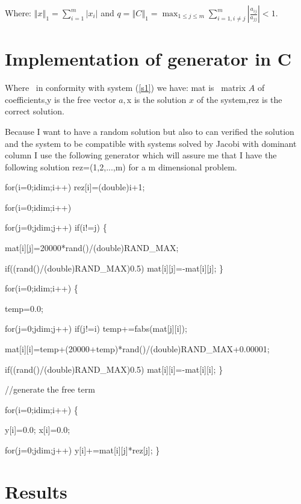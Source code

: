 \documentclass[a4paper]{article}
\begin{document}
Where: $\left\Vert x\right\Vert _{1}=\sum_{i=1}^{m}\left\vert
x_{i}\right\vert $ and $q=\left\Vert C\right\Vert _{1}=\max_{1\leq j\leq
m}\sum_{i=1,i\neq j}^{m}\left\vert \frac{a_{ij}}{a_{jj}}\right\vert <1$.

\section{Implementation of generator in C}

Where \ in conformity with system (\ref{s1}) we have: mat is \ matrix $A$ of
coefficients,y is the free vector $a,$x is the solution $x$ of the
system,rez is the correct solution.

Because I want to have a random solution but also to can verified the
solution and the system to be compatible with systems solved by Jacobi with
dominant column I use the following generator which will assure me that I
have the following solution rez=(1,2,...,m) for a m dimensional problem.

{\small \qquad for(i=0;i\TEXTsymbol{<}dim;i++) rez[i]=(double)i+1;}

{\small \qquad for(i=0;i\TEXTsymbol{<}dim;i++)}

{\small \qquad \qquad for(j=0;j\TEXTsymbol{<}dim;j++) if(i!=j) \{}

{\small \qquad \qquad \qquad \qquad mat[i][j]=20000*rand()/(double)RAND\_MAX;%
}

{\small \qquad \qquad \qquad \qquad if((rand()/(double)RAND\_MAX)\TEXTsymbol{%
<}0.5) mat[i][j]=-mat[i][j]; \}}

{\small \qquad for(i=0;i\TEXTsymbol{<}dim;i++) \{}

{\small \qquad \qquad temp=0.0;}

{\small \qquad \qquad for(j=0;j\TEXTsymbol{<}dim;j++) if(j!=i)
temp+=fabs(mat[j][i]);}

{\small \qquad \qquad
mat[i][i]=temp+(20000+temp)*rand()/(double)RAND\_MAX+0.00001;}

{\small \qquad \qquad if((rand()/(double)RAND\_MAX)\TEXTsymbol{<}0.5)
mat[i][i]=-mat[i][i]; \}}

{\small \qquad //generate the free term}

{\small \qquad for(i=0;i\TEXTsymbol{<}dim;i++) \{}

{\small \qquad \qquad y[i]=0.0; x[i]=0.0;}

{\small \qquad \qquad for(j=0;j\TEXTsymbol{<}dim;j++)
y[i]+=mat[i][j]*rez[j]; \}}

\section{Results}
\end{document}
